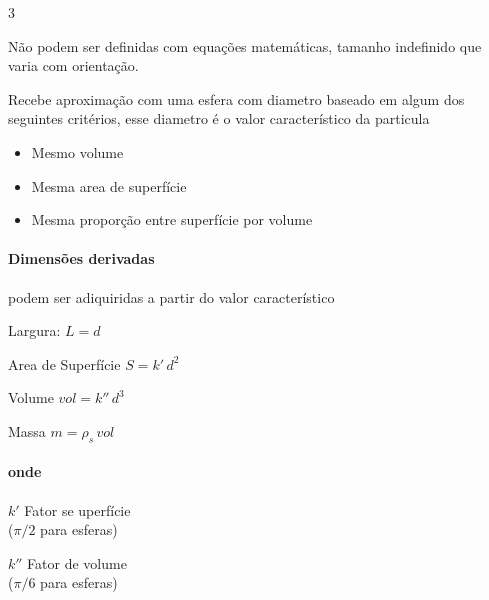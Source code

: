 \documentclass["./OSF-Slides_annotations.tex"]{subfiles}
\begin{document}
\begin{sectionBox}
\begin{sectionBox}
    \end{sectionBox}
    
    \begin{sectionBox}3{} %
        
        Não podem ser definidas com equações matemáticas,
        tamanho indefinido que varia com orientação.
        
        Recebe aproximação com uma esfera com diametro baseado em algum dos seguintes critérios, esse diametro é o valor característico da particula
        \begin{itemize}
            \item Mesmo volume
            \item Mesma area de superfície
            \item Mesma proporção entre superfície por volume
        \end{itemize}

        \paragraph*{Dimensões derivadas} podem ser adiquiridas a partir do valor característico
        \begin{itemize}
            \begin{multicols}{2}
                \item Largura: \(L=d\)
                \item Area de Superfície \(S = k'\,d^2\)
                \item Volume \(vol = k''\,d^3\)
                \item Massa \(m = \rho_s\,vol\)
            \end{multicols}
        \end{itemize}

        \paragraph*{onde}
        \begin{itemize}
            \begin{multicols}{2}
                \item \(k'\) Fator se uperfície\\(\(\pi/2\) para esferas)
                \item \(k''\) Fator de volume\\(\(\pi/6\) para esferas)
            \end{multicols}
        \end{itemize}
        
    \end{sectionBox}

\end{sectionBox}
\end{document}
